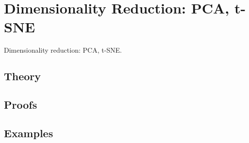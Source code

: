 
\section{Dimensionality Reduction: PCA, t-SNE}
\label{sec:1.4.07-dim-reduction}

\begin{ticket}
Dimensionality reduction: PCA, t-SNE.
\end{ticket}

\subsection*{Theory}

\subsection*{Proofs}

\subsection*{Examples}
